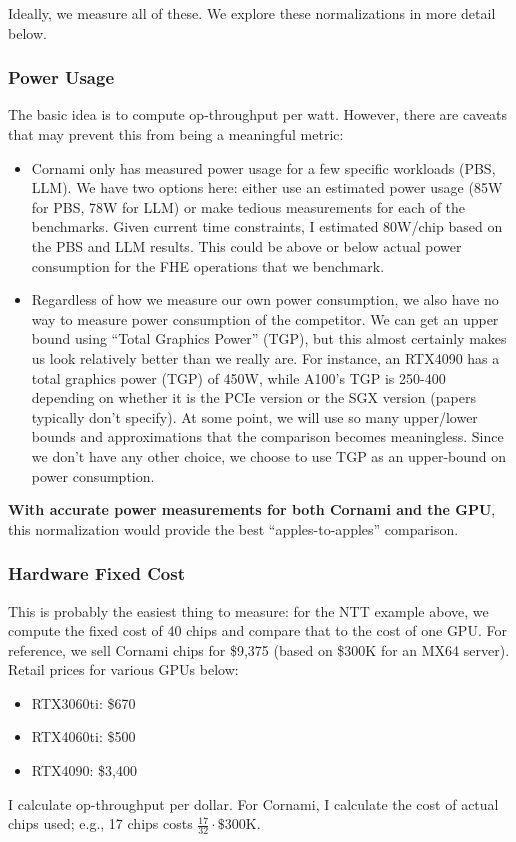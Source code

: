 \documentclass{article}
\begin{document}
	Ideally, we measure all of these. We explore these normalizations in more detail below.
	
	\subsubsection{Power Usage}
	\label{sec:powerusage}
	The basic idea is to compute op-throughput per watt. However, there are caveats that may prevent this from being a meaningful metric:
	\begin{itemize}
		\item Cornami only has measured power usage for a few specific workloads (PBS, LLM). We have two options here: either use an estimated power usage (85W for PBS, 78W for LLM) or make tedious measurements for each of the benchmarks. Given current time constraints, I estimated 80W/chip based on the PBS and LLM results. This could be above or below actual power consumption for the FHE operations that we benchmark.
		\item Regardless of how we measure our own power consumption, we also have no way to measure power consumption of the competitor. We can get an upper bound using ``Total Graphics Power'' (TGP), but this almost certainly makes us look relatively better than we really are. For instance, an RTX4090 has a total graphics power (TGP) of 450W, while A100's TGP is 250-400 depending on whether it is the PCIe version or the SGX version (papers typically don't specify). At some point, we will use so many upper/lower bounds and approximations that the comparison becomes meaningless. Since we don't have any other choice, we choose to use TGP as an upper-bound on power consumption.
	\end{itemize}
	\textbf{With accurate power measurements for both Cornami and the GPU}, this normalization would provide the best ``apples-to-apples'' comparison.
	
	\subsubsection{Hardware Fixed Cost}
	This is probably the easiest thing to measure: for the NTT example above, we compute the fixed cost of 40 chips and compare that to the cost of one GPU. For reference, we sell Cornami chips for \$9,375 (based on \$300K for an MX64 server). Retail prices for various GPUs below:
	\begin{itemize}
		\item RTX3060ti: \$670
		\item RTX4060ti: \$500
		\item RTX4090: \$3,400
	\end{itemize}
	I calculate op-throughput per dollar. For Cornami, I calculate the cost of actual chips used; e.g., 17 chips costs $\frac{17}{32}\cdot \mathrm{\$300K}$.
	
\end{document}
